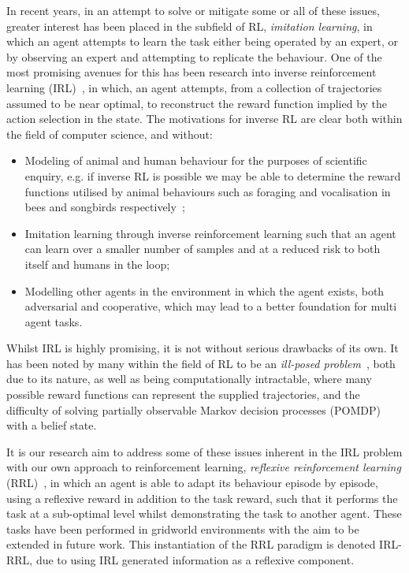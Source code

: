 \documentclass[10pt,technote]{IEEEtran}
\begin{document}
In recent years, in an attempt to solve or mitigate some or all of these issues, greater interest has been placed in the subfield of RL, \emph{imitation learning}, in which an agent attempts to learn the task either being operated by an expert, or by observing an expert and attempting to replicate the behaviour. One of the most promising avenues for this has been research into inverse reinforcement learning (IRL)~\cite{ng2000algorithms}, in which, an agent attempts, from a collection of trajectories assumed to be near optimal, to reconstruct the reward function implied by the action selection in the state. The motivations for inverse RL are clear both within the field of computer science, and without:

\begin{itemize}
\item Modeling of animal and human behaviour for the purposes of scientific enquiry, e.g. if inverse RL is possible we may be able to determine the reward functions utilised by animal behaviours such as foraging and vocalisation in bees and songbirds respectively~\cite{ng2000algorithms};
\item Imitation learning through inverse reinforcement learning such that an agent can learn over a smaller number of samples and at a reduced risk to both itself and humans in the loop;
\item Modelling other agents in the environment in which the agent exists, both adversarial and cooperative, which may lead to a better foundation for multi agent tasks.
\end{itemize}

Whilst IRL is highly promising, it is not without serious drawbacks of its own. It has been noted by many within the field of RL to be an \emph{ill-posed problem}~\cite{abbeel2004apprenticeship, ziebart2008maximum, choi2011inverse}, both due to its nature, as well as being computationally intractable, where many possible reward functions can represent the supplied trajectories, and the difficulty of solving partially observable Markov decision processes (POMDP) with a belief state.

It is our research aim to address some of these issues inherent in the IRL problem with our own approach to reinforcement learning, \emph{reflexive reinforcement learning} (RRL)~\cite{ncta20}, in which an agent is able to adapt its behaviour episode by episode, using a reflexive reward in addition to the task reward, such that it performs the task at a sub-optimal level whilst demonstrating the task to another agent. These tasks have been performed in gridworld environments with the aim to be extended in future work. This instantiation of the RRL paradigm is denoted IRL-RRL, due to using IRL generated information as a reflexive component.
\end{document}
